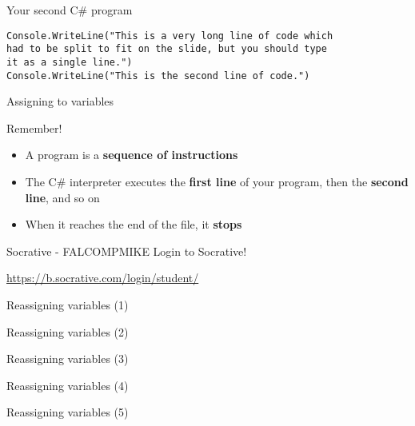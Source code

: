 \begin{frame}[fragile]{Your second C\# program}
\begin{lstlisting}
Console.WriteLine("This is a very long line of code which
had to be split to fit on the slide, but you should type 
it as a single line.")
Console.WriteLine("This is the second line of code.")
\end{lstlisting}
\end{frame}

\begin{frame}{Assigning to variables}
\end{frame}

\begin{frame}{Remember!}
\begin{itemize}
\item A program is a \textbf{sequence of instructions}
\item The C\# interpreter executes the \textbf{first line} of your program, then the \textbf{second line},
and so on
\item When it reaches the end of the file, it \textbf{stops}
\end{itemize}
\end{frame}

\begin{frame}{Socrative - FALCOMPMIKE}
Login to Socrative!

\vspace{1em}

\url{https://b.socrative.com/login/student/}

\end{frame}

\begin{frame}{Reassigning variables (1)}
\end{frame}

\begin{frame}{Reassigning variables (2)}
\end{frame}

\begin{frame}{Reassigning variables (3)}
\end{frame}

\begin{frame}{Reassigning variables (4)}
\end{frame}

\begin{frame}{Reassigning variables (5)}
\end{frame}

